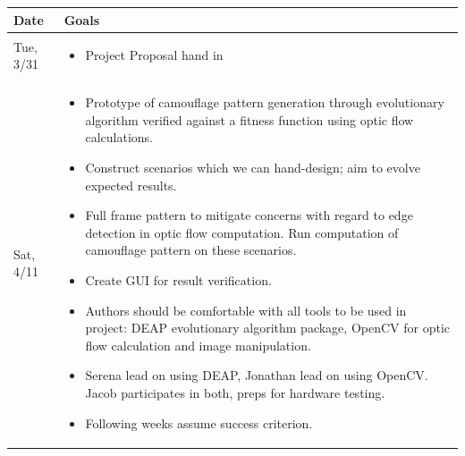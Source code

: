 \documentclass[12pt,letter]{article}
\begin{document}
\begin{table}[H]
\begin{tabular}{|p{} | p{}|}
\hline
	\textbf{Date} & \textbf{Goals} \\
\hline
Tue, 3/31 & \begin{itemize} \item Project Proposal hand in                                                                                                                                                                                                                                                                                                                                                                                                                                                                                                                                                                                                                                                                                                                                                                                       \end{itemize} \\
\hline
Sat, 4/11 & \begin{itemize} \item Prototype of camouflage pattern generation through evolutionary algorithm verified against a fitness function using optic flow calculations. \item Construct scenarios which we can hand-design; aim to evolve expected results. \item Full frame pattern to mitigate concerns with regard to edge detection in optic flow computation. Run computation of camouflage pattern on these scenarios. \item Create GUI for result verification. \item Authors should be comfortable with all tools to be used in project: DEAP evolutionary algorithm package, OpenCV for optic flow calculation and image manipulation. \item Serena lead on using DEAP, Jonathan lead on using OpenCV. Jacob participates in both, preps for hardware testing. \item Following weeks assume success criterion. \end{itemize} \\ \hline

\end{tabular}
\end{table}
\end{document}
